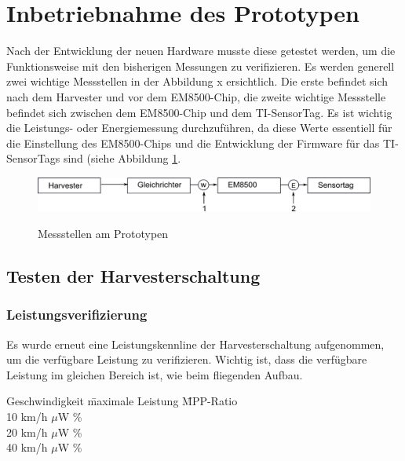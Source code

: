 \section{Inbetriebnahme des Prototypen}
Nach der Entwicklung der neuen Hardware musste diese getestet werden, um die Funktionsweise mit den bisherigen Messungen zu verifizieren. Es werden generell zwei wichtige Messstellen in der Abbildung x ersichtlich. Die erste befindet sich nach dem Harvester und vor dem EM8500-Chip, die zweite wichtige Messstelle befindet sich zwischen dem EM8500-Chip und dem TI-SensorTag. Es ist wichtig die Leistungs- oder Energiemessung durchzuführen, da diese Werte essentiell für die Einstellung des EM8500-Chips und die Entwicklung der Firmware für das TI-SensorTags sind (siehe Abbildung \ref{EnergieMessungStellen}. 

\begin{figure}[ht]
  \includegraphics[width=1.0\textwidth]{3Vorgehen/imag/EnergiemessungStellen.png}               \label{EnergieMessungStellen} 
  \caption{Messstellen am Prototypen}
\end{figure}

\subsection{Testen der Harvesterschaltung}

\subsubsection{Leistungsverifizierung}

Es wurde erneut eine Leistungskennline der Harvesterschaltung aufgenommen, um die verfügbare Leistung zu verifizieren. Wichtig ist, dass die verfügbare Leistung im gleichen Bereich ist, wie beim fliegenden Aufbau. 


\begin{tabbing}
    Geschwindigkeit   \quad\= maximale Leistung    \quad\= MPP-Ratio\\[0.8ex]
    10 km/h         $\mu$W   \%\\
	20 km/h         $\mu$W   \%\\
	40 km/h         $\mu$W   \%\\
	
\end{tabbing}%

